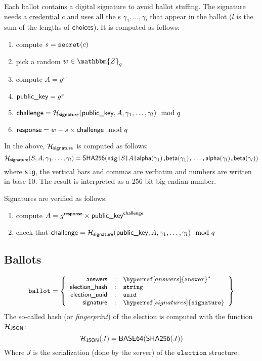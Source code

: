 \documentclass[a4paper]{article}
\newcommand{\Z}{\mathbbm{Z}}
\newcommand{\basesixfour}{\textsf{BASE64}}
\newcommand{\shatwo}{\textsf{SHA256}}
\newcommand{\jstring}{\texttt{string}}
\newcommand{\uuid}{\texttt{uuid}}
\newcommand{\election}{\texttt{election}}
\newcommand{\ballot}{\texttt{ballot}}
\begin{document}
Each ballot contains a digital signature to avoid ballot stuffing. The
signature needs a \hyperref[credentials]{credential} $c$ and uses all
the \ciphertext{}s $\gamma_1,\dots,\gamma_l$ that appear in the ballot
($l$ is the sum of the lengths of $\textsf{choices}$). It is computed as
follows:
\begin{enumerate}
\item compute $s=\texttt{secret}(c)$
\item pick a random $w\in\Z_q$
\item compute $A=g^w$
\item $\textsf{public\_key}=g^s$
\item $\textsf{challenge}=\mathcal{H}_{\textsf{signature}}(\textsf{public\_key},A,\gamma_1,\dots,\gamma_l)\mod q$
\item $\textsf{response}=w-s\times\textsf{challenge}\mod q$
\end{enumerate}
In the above, $\mathcal{H}_{\textsf{signature}}$ is computed as follows:
\[
\Hash_\siglabel(S,A,\gamma_1,\dots,\gamma_l)=\shatwo(\verb=sig|=S\verb=|=A\verb=|=\alphalabel(\gamma_1)\verb=,=\betalabel(\gamma_1)\verb=,=\dots\verb=,=\alphalabel(\gamma_l)\verb=,=\betalabel(\gamma_l))
\]
where \verb=sig=, the vertical bars and commas are verbatim and
numbers are written in base 10. The result is interpreted as a 256-bit
big-endian number.

Signatures are verified as follows:
\begin{enumerate}
\item compute $A=g^{\textsf{response}}\times \textsf{public\_key}^{\textsf{challenge}}$
\item check that $\textsf{challenge}=\mathcal{H}_{\textsf{signature}}(\textsf{public\_key},A,\gamma_1,\dots,\gamma_l)\mod q$
\end{enumerate}

\subsection{Ballots}
\label{ballots}

\newcommand{\json}{\textsf{JSON}}

\begin{gather*}
  \ballot=\left\{\small
    \begin{array}{rcl}
      \answers&:&\hyperref[answers]{\answer}^\ast\\
      \textsf{election\_hash}&:&\jstring\\
      \textsf{election\_uuid}&:&\uuid\\
      \siglabel&:&\hyperref[signatures]{\signature}
    \end{array}
  \right\}
\end{gather*}
The so-called hash (or \emph{fingerprint}) of the election
is computed with the function $\Hash_\json$:
\[
\Hash_\json(J)=\basesixfour(\shatwo(J))
\]
Where $J$ is the serialization (done by the server) of the $\election$
structure.
\end{document}
